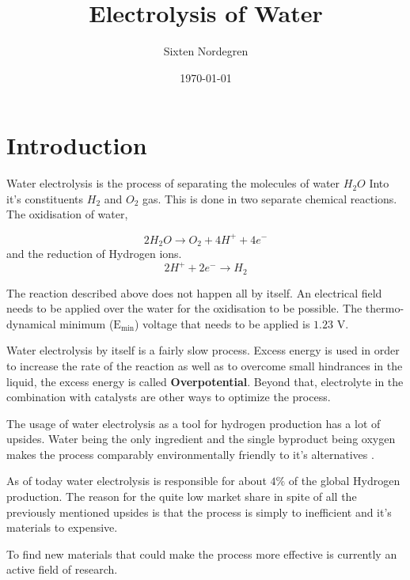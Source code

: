 \documentclass[twocolumn, floatfix]{revtex4-2}
\begin{document}
\raggedbottom
\title{Electrolysis of Water}
\author{Sixten Nordegren}

\date{\today}

\maketitle
\section{Introduction}
Water electrolysis is the process of separating the molecules of water $H_2O$ Into it's 
constituents $H_2$ and $O_2$ gas. This is done in two separate chemical reactions. The
oxidisation of water,

\begin{equation}
	2H_2O \rightarrow O_2 + 4 H^+ +4e^- 
	\label{eq: oxidisation}
\end{equation}
and the reduction of Hydrogen ions.
\begin{equation}
	2 H^+ + 2e^- \rightarrow H_2
	\label{eq: reduction}
\end{equation}

The reaction described above does not happen all by itself. An electrical field needs to be
applied over the water for the oxidisation to be possible. The 
thermo-dynamical minimum ($\text{E}_{\text{min}}$) voltage that needs to be applied is $1.23$ V. 

\par
Water electrolysis by itself is a fairly slow process. Excess energy is used in order to increase
the rate of the reaction as well as to overcome small hindrances in the liquid, the excess energy 
is called \textbf{Overpotential}. Beyond that, electrolyte
in the combination with catalysts are other ways to optimize the process. 
\par
The usage of water electrolysis as a tool for hydrogen production has a lot of upsides. Water being the 
only ingredient and the single byproduct being oxygen makes the process comparably
environmentally friendly to it's alternatives \cite{DOSSANTOS2017563}.
\par 
As of today water electrolysis is responsible for about $4\%$ of the global Hydrogen
production. The reason for the quite low market share in spite of all the previously mentioned upsides 
is that the process is simply to inefficient and it's materials to expensive\cite{SHIVAKUMAR2019442}.

To find new materials that could make the process more effective is currently an active field of 
research.
\end{document}
